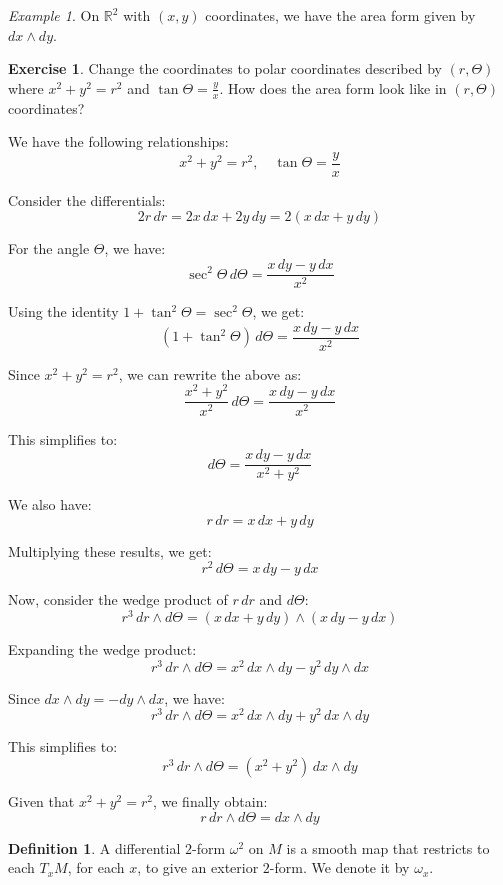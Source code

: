 \documentclass[11pt]{article}
\theoremstyle{definition}
\newtheorem{definition}{Definition}[section]
\newtheorem{exercise}{Exercise}
\theoremstyle{remark}
\newtheorem{example}{Example}[section]
\begin{document}
\begin{example}\label{ex:area_form}
On $\mathbb{R}^2$ with $(x,y)$ coordinates, we have the area form given by $dx \wedge dy$.
\end{example}

\begin{exercise}
Change the coordinates to polar coordinates described by $(r, \Theta)$ where $x^2 + y^2 = r^2$ and $\tan \Theta = \frac{y}{x}$. How does the area form look like in $(r, \Theta)$ coordinates?
\end{exercise}

We have the following relationships:
\[
x^2 + y^2 = r^2, \quad \tan \Theta = \frac{y}{x}
\]

Consider the differentials:
\[
2r\,dr = 2x\,dx + 2y\,dy = 2(x\,dx + y\,dy)
\]

For the angle $\Theta$, we have:
\[
\sec^2 \Theta \, d\Theta = \frac{x\,dy - y\,dx}{x^2}
\]

Using the identity $1 + \tan^2 \Theta = \sec^2 \Theta$, we get:
\[
(1 + \tan^2 \Theta) \, d\Theta = \frac{x\,dy - y\,dx}{x^2}
\]

Since $x^2 + y^2 = r^2$, we can rewrite the above as:
\[
\frac{x^2 + y^2}{x^2} \, d\Theta = \frac{x\,dy - y\,dx}{x^2}
\]

This simplifies to:
\[
d\Theta = \frac{x\,dy - y\,dx}{x^2 + y^2}
\]

We also have:
\[
r\,dr = x\,dx + y\,dy
\]

Multiplying these results, we get:
\[
r^2\,d\Theta = x\,dy - y\,dx
\]

Now, consider the wedge product of $r\,dr$ and $d\Theta$:
\[
r^3\,dr \wedge d\Theta = (x\,dx + y\,dy) \wedge (x\,dy - y\,dx)
\]

Expanding the wedge product:
\[
r^3\,dr \wedge d\Theta = x^2\,dx \wedge dy - y^2\,dy \wedge dx
\]

Since $dx \wedge dy = -dy \wedge dx$, we have:
\[
r^3\,dr \wedge d\Theta = x^2\,dx \wedge dy + y^2\,dx \wedge dy
\]

This simplifies to:
\[
r^3\,dr \wedge d\Theta = (x^2 + y^2)\,dx \wedge dy
\]

Given that $x^2 + y^2 = r^2$, we finally obtain:
\[
r\,dr \wedge d\Theta = dx \wedge dy
\]

\begin{definition}\label{def:differential_2_form_manifold}
A differential $2$-form $\omega^2$ on $M$ is a smooth map that restricts to each $T_x M$, for each $x$, to give an exterior $2$-form. We denote it by $\omega_x$.
\end{definition}
\end{document}
